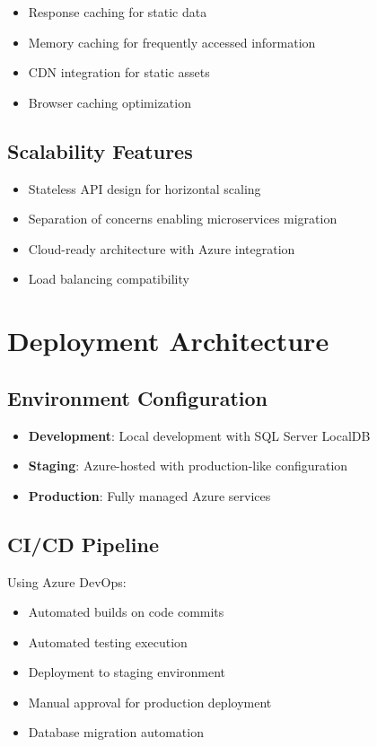 \documentclass[12pt,a4paper]{article}
\begin{document}
\begin{itemize}
    \item Response caching for static data
    \item Memory caching for frequently accessed information
    \item CDN integration for static assets
    \item Browser caching optimization
\end{itemize}

\subsection{Scalability Features}

\begin{itemize}
    \item Stateless API design for horizontal scaling
    \item Separation of concerns enabling microservices migration
    \item Cloud-ready architecture with Azure integration
    \item Load balancing compatibility
\end{itemize}

\section{Deployment Architecture}

\subsection{Environment Configuration}

\begin{itemize}
    \item \textbf{Development}: Local development with SQL Server LocalDB
    \item \textbf{Staging}: Azure-hosted with production-like configuration
    \item \textbf{Production}: Fully managed Azure services
\end{itemize}

\subsection{CI/CD Pipeline}

Using Azure DevOps:
\begin{itemize}
    \item Automated builds on code commits
    \item Automated testing execution
    \item Deployment to staging environment
    \item Manual approval for production deployment
    \item Database migration automation
\end{itemize}
\end{document}
